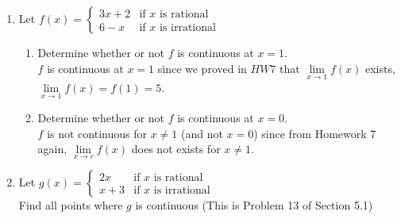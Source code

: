 \documentclass[12pt,letterpaper]{article}
\newcommand{\R}{\mathbb{R}}
\theoremstyle{case}
\theoremstyle{definition}
\begin{document}
\begin{enumerate}
\begin{enumerate}
\begin{proof}
				$\therefore$ We have that $f(x)$ is continuous $\forall\ c \in \R$.
			\end{proof}
		\end{enumerate}
		
		\item Let $f(x)=\begin{cases}
			3x+2 & \text{if } x \text{ is rational} \\
			6-x & \text{if } x \text{ is irrational}
		\end{cases}$
		\begin{enumerate}
			\item Determine whether or not $f$ is continuous at $x=1$.\\
			
			$f$ is continuous at $x=1$ since we proved in $HW 7$ that $\lim\limits_{x \to 1} f(x)$ exists, $\lim\limits_{x \to 1} f(x)=f(1)=5$.
			
			\item Determine whether or not $f$ is continuous at $x=0$.\\
			
			$f$ is not continuous for $x \neq 1$ (and not $x = 0$) since from Homework 7 again, $\lim\limits_{x \to c} f(x)$ does not exists for $x \neq 1$.
		\end{enumerate}
	
		\item Let $g(x)=\begin{cases}
			2x & \text{if } x \text{ is rational} \\
			x+3 & \text{if } x \text{ is irrational}
		\end{cases}$ \\
		Find all points where $g$ is continuous (This is Problem 13 of Section 5.1)\\
		

\end{enumerate}
\end{document}
